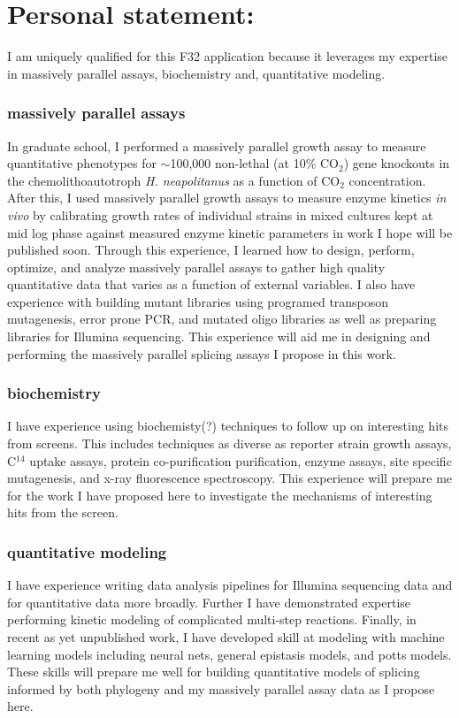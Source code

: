 \documentclass{article}
\begin{document}
\section*{Personal statement:}
I am uniquely qualified for this F32 application because it leverages my expertise in massively parallel assays, biochemistry and, quantitative modeling.
\subsubsection*{massively parallel assays}
In graduate school, I performed a massively parallel growth assay to measure quantitative phenotypes for $\sim$100,000 non-lethal (at 10\% CO$_2$) gene knockouts in the chemolithoautotroph \textit{H. neapolitanus} as a function of CO$_2$ concentration.\supercite{Desmarais2019-yc,Flamholz2022-yo}
After this, I used massively parallel growth assays to measure enzyme kinetics \textit{in vivo} by calibrating growth rates of individual strains in mixed cultures kept at mid log phase against measured enzyme kinetic parameters in work I hope will be published soon.
Through this experience, I learned how to design, perform, optimize, and analyze massively parallel assays to gather high quality quantitative data that varies as a function of external variables.
I also have experience with building mutant libraries using programed transposon mutagenesis,\supercite{Desmarais2019-yc} error prone PCR, and mutated oligo libraries as well as preparing libraries for Illumina sequencing.\supercite{Desmarais2019-yc}
This experience will aid me in designing and performing the massively parallel splicing assays I propose in this work.
\subsubsection*{biochemistry} %
I have experience using biochemisty(?) techniques to follow up on interesting hits from screens. 
This includes techniques as diverse as reporter strain growth assays, C$^14$ uptake assays, protein co-purification purification, enzyme assays, site specific mutagenesis, and x-ray fluorescence spectroscopy.\supercite{Desmarais2019-yc,Liu2019-nk} 
This experience will prepare me for the work I have proposed here to investigate the mechanisms of interesting hits from the screen.
\subsubsection*{quantitative modeling}
I have experience writing data analysis pipelines for Illumina sequencing data and for quantitative data more broadly.\supercite{Desmarais2019-yc,Liu2021-pu,Flamholz2022-yo}
Further I have demonstrated expertise performing kinetic modeling of complicated multi-step reactions.\supercite{Liu2021-pu}
Finally, in recent as yet unpublished work, I have developed skill at modeling with machine learning models including neural nets, general epistasis models, and potts models.
These skills will prepare me well for building quantitative models of splicing informed by both phylogeny and my massively parallel assay data as I propose here.



\printbibliography[heading=none]
\end{document}
